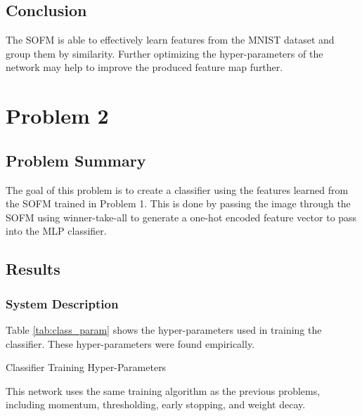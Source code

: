 \documentclass[a4paper, 12pt, titlepage]{article}
\newcommand{\tabRef}[1]{Table \ref{#1}}
\begin{document}
  \subsection{Conclusion}
  \par The SOFM is able to effectively learn features from the MNIST dataset
  and group them by similarity.
  Further optimizing the hyper-parameters of the network may help to improve
  the produced feature map further.

  \pagebreak
  \section{Problem 2}
  \subsection{Problem Summary}
  \par The goal of this problem is to create a classifier using the features
  learned from the SOFM trained in Problem 1.
  This is done by passing the image through the SOFM using winner-take-all to
  generate a one-hot encoded feature vector to pass into the MLP classifier.

  \subsection{Results}
  \subsubsection{System Description}
  \par \tabRef{tab:class_param} shows the hyper-parameters used in training the
  classifier.
  These hyper-parameters were found empirically.
  \begin{table}[htb]
    \centering
    \vspace{-12pt}
    \caption{Classifier Training Hyper-Parameters}
    \vspace{-12pt}
    \label{tab:class_param}
    \vspace{-12pt}
  \end{table}
  \par This network uses the same training algorithm as the previous problems,
  including momentum, thresholding, early stopping, and weight decay.
\end{document}
